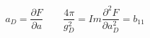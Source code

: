 \begin{equation}
a_D=\frac{\partial F}{\partial a}\qquad \frac{4\pi}{g_D^2}=Im\frac{\partial^2 F}{\partial a_D^2}=b_{11}
\end{equation}


